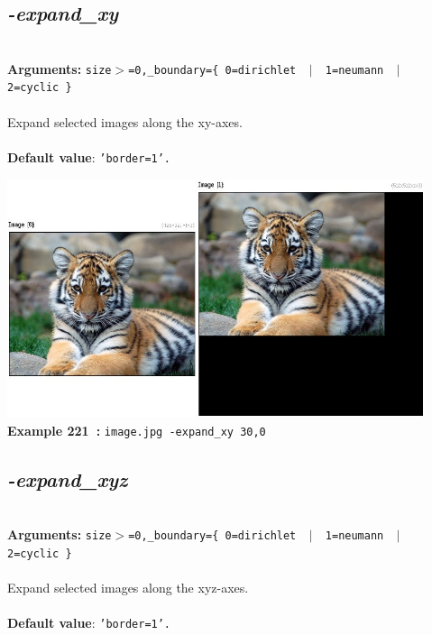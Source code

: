 \documentclass[a4paper,11pt,twoside]{book}
\begin{document}
\subsection{\emph{-expand\_xy} }\vspace*{-0.5em}
~\\\textbf{Arguments: } 
{\small \texttt{size$>$=0,\_boundary=\{ 0=dirichlet ~$|$~ 1=neumann ~$|$~ 2=cyclic \}}}\\~\\
Expand selected images along the xy-axes.
~\\~\\\textbf{Default value}: {\small \texttt{'border=1'.}}
\begin{center}\includegraphics[keepaspectratio=true,height=7cm,width=\textwidth]{img/gmic_def221.jpg}\\
{\footnotesize \textbf{Example 221~:} \texttt{image.jpg -expand\_xy 30,0}}
\end{center}

\subsection{\emph{-expand\_xyz} }\vspace*{-0.5em}
~\\\textbf{Arguments: } 
{\small \texttt{size$>$=0,\_boundary=\{ 0=dirichlet ~$|$~ 1=neumann ~$|$~ 2=cyclic \}}}\\~\\
Expand selected images along the xyz-axes.
~\\~\\\textbf{Default value}: {\small \texttt{'border=1'.}}
\end{document}
